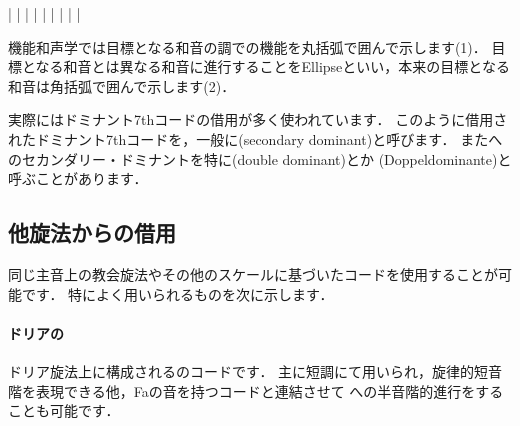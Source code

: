\documentclass[dvipdfmx,uplatex,b5paper,openany,jbase=12Q,nomag*,textwidth-limit=44%
               ]{gachimuchi}
\begin{document}
\begin{Music}
  \generalmeter{\meterC}%
  \Startpiece%
  \NOTes%
  |%
  \en\bar%
  \NOTes%
  |%
  \en\bar%
  \NOTes%
  |%
  \en\bar%
  \NOTes%
  |%
  \en\bar%
  \NOTEs%
  |%
  \en\setdoublebar%
  \endpiece{}%
\end{Music}
\begin{NB}
  機能和声学では目標となる和音の調での機能を丸括弧で囲んで示します(1)．
  目標となる和音とは異なる和音に進行することをEllipseといい，本来の目標となる和音は角括弧で囲んで示します(2)．
\end{NB}

実際にはドミナント7thコードの借用が多く使われています．
このように借用されたドミナント7thコードを，一般に\jghost(secondary dominant)と呼びます．
また\Gnv へのセカンダリー・ドミナントを特に\jghost(double dominant)とか
\jghost(Doppeldominante)と呼ぶことがあります．

\subsection{他旋法からの借用}
同じ主音上の教会旋法やその他のスケールに基づいたコードを使用することが可能です．
特によく用いられるものを次に示します．

\paragraph{ドリアの\Gniv{}}
ドリア旋法上に構成される\Gniv{}のコードです．
主に短調にて用いられ，旋律的短音階を表現できる他，Faの音を持つコードと連結させて
\Gnv への半音階的進行をすることも可能です．
\end{document}
